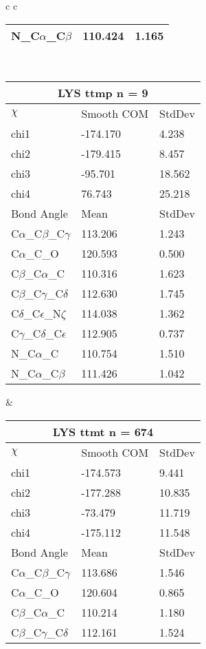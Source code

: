 \begin{longtable}{ c c }
\begin{tabular}{ l l l }
  N\_C$\alpha$\_C$\beta$ & 110.424 & 1.165\\
  \bottomrule
  \end{tabular}
  \\
  \begin{tabular}{ l l l }
  \toprule
  \multicolumn{3}{c}{LYS \textbf{ttmp} n = 9} \\ \toprule
  $\chi$       & Smooth COM & StdDev \\ \midrule
  chi1 & -174.170 & 4.238 \\ 
  chi2 & -179.415 & 8.457 \\ 
  chi3 & -95.701 & 18.562 \\ 
  chi4 & 76.743 & 25.218 \\ \midrule
  Bond Angle   & Mean     & StdDev \\ \midrule
  C$\alpha$\_C$\beta$\_C$\gamma$ & 113.206 & 1.243\\
  C$\alpha$\_C\_O & 120.593 & 0.500\\
  C$\beta$\_C$\alpha$\_C & 110.316 & 1.623\\
  C$\beta$\_C$\gamma$\_C$\delta$ & 112.630 & 1.745\\
  C$\delta$\_C$\epsilon$\_N$\zeta$ & 114.038 & 1.362\\
  C$\gamma$\_C$\delta$\_C$\epsilon$ & 112.905 & 0.737\\
  N\_C$\alpha$\_C & 110.754 & 1.510\\
  N\_C$\alpha$\_C$\beta$ & 111.426 & 1.042\\
  \bottomrule
  \end{tabular}
  &
  \begin{tabular}{ l l l }
  \toprule
  \multicolumn{3}{c}{LYS \textbf{ttmt} n = 674} \\ \toprule
  $\chi$       & Smooth COM & StdDev \\ \midrule
  chi1 & -174.573 & 9.441 \\ 
  chi2 & -177.288 & 10.835 \\ 
  chi3 & -73.479 & 11.719 \\ 
  chi4 & -175.112 & 11.548 \\ \midrule
  Bond Angle   & Mean     & StdDev \\ \midrule
  C$\alpha$\_C$\beta$\_C$\gamma$ & 113.686 & 1.546\\
  C$\alpha$\_C\_O & 120.604 & 0.865\\
  C$\beta$\_C$\alpha$\_C & 110.214 & 1.180\\
  C$\beta$\_C$\gamma$\_C$\delta$ & 112.161 & 1.524\\

\end{tabular}
\end{longtable}
